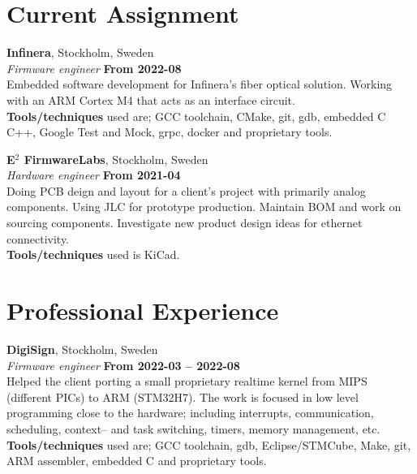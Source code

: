 \documentclass[a4paper,margin,line]{res} \usepackage{latexsym}
\begin{document}
\begin{resume}


\section{\sc Current Assignment}

{\bf Infinera}, Stockholm, Sweden\\
{\em Firmware engineer} \hfill {\bf From 2022-08}\\
Embedded software development for Infinera's fiber optical solution. 
Working with an ARM Cortex M4 that acts as an interface circuit. 
\\ {\bf Tools/techniques} used are; GCC toolchain, CMake, git, gdb, embedded C C++,
Google Test and Mock, grpc, docker and proprietary tools.

{\bf E$^2$ FirmwareLabs}, Stockholm, Sweden\\
{\em Hardware engineer} \hfill {\bf From 2021-04}\\
Doing PCB deign and layout for a client's project with primarily
analog components. Using JLC for prototype production. Maintain BOM
and work on sourcing components. Investigate new product design ideas
for ethernet connectivity.
\\ {\bf Tools/techniques} used is KiCad.

\vspace{3mm}

\section{\sc Professional Experience}

{\bf DigiSign}, Stockholm, Sweden\\
{\em Firmware engineer} \hfill {\bf From 2022-03 -- 2022-08}\\
Helped the client porting a small proprietary realtime kernel from 
MIPS (different PICs) to ARM (STM32H7). The work is focused in low 
level programming close to the hardware; including interrupts, communication, 
scheduling, context-- and task switching, timers, memory management, etc.
\\ {\bf Tools/techniques} used are; GCC toolchain, gdb, Eclipse/STMCube, Make, git, 
ARM assembler, embedded C and proprietary tools.


\end{resume}
\end{document}
